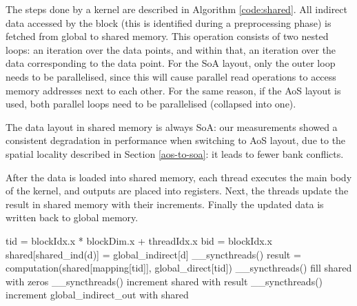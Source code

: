 
The steps done by a kernel are described in Algorithm \ref{code:shared}. All
indirect data accessed by the block (this is identified during a preprocessing
phase) is fetched from global to shared memory. This operation consists of two
nested loops: an iteration over the data points, and within that, an iteration
over the data corresponding to the data point. For the SoA layout, only the
outer loop needs to be parallelised, since this will cause parallel read
operations to access memory addresses next to each other. For the same reason,
if the AoS layout is used, both parallel loops need to be parallelised
(collapsed into one).

The data layout in shared memory is always SoA: our measurements showed a
consistent degradation in performance when switching to AoS layout, due to the
spatial locality described in Section \ref{aos-to-soa}: it leads to fewer bank
conflicts.

After the data is loaded into shared memory, each thread executes the main body of the kernel, and outputs are placed into registers.  Next, the
threads update the result in shared memory with their increments. Finally the
updated data is written back to global memory.

\begin{algorithm}
  \begin{algorithmic}
    \State tid = blockIdx.x * blockDim.x + threadIdx.x
    \State bid = blockIdx.x
      \State shared[shared\_ind(d)] = global\_indirect[d]
    \EndFor
    \State \_\_syncthreads()
    \State result = computation(shared[mapping[tid]], global\_direct[tid])
    \State \_\_syncthreads()
    \State fill shared with zeros
    \State \_\_syncthreads()
        \State increment shared with result
      \EndIf
      \State \_\_syncthreads()
    \EndFor
      \State increment global\_indirect\_out with shared
    \EndFor
  \end{algorithmic}
  \caption{Algorithm to use the shared memory to preload indirect data accessed
  within a thread block. \lstinline!global_indirect! holds the data indirectly
  read, \lstinline!global_indirect_out! holds the result of the iteration.}
  \label{code:shared}
\end{algorithm}


